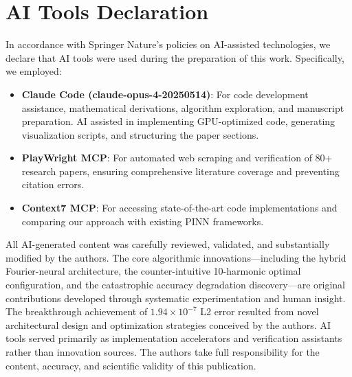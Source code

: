 \section*{AI Tools Declaration}

In accordance with Springer Nature's policies on AI-assisted technologies, we declare that AI tools were used during the preparation of this work. Specifically, we employed:

\begin{itemize}
\item \textbf{Claude Code (claude-opus-4-20250514)}: For code development assistance, mathematical derivations, algorithm exploration, and manuscript preparation. AI assisted in implementing GPU-optimized code, generating visualization scripts, and structuring the paper sections.
\item \textbf{PlayWright MCP}: For automated web scraping and verification of 80+ research papers, ensuring comprehensive literature coverage and preventing citation errors.
\item \textbf{Context7 MCP}: For accessing state-of-the-art code implementations and comparing our approach with existing PINN frameworks.
\end{itemize}

All AI-generated content was carefully reviewed, validated, and substantially modified by the authors. The core algorithmic innovations—including the hybrid Fourier-neural architecture, the counter-intuitive 10-harmonic optimal configuration, and the catastrophic accuracy degradation discovery—are original contributions developed through systematic experimentation and human insight. The breakthrough achievement of $1.94 \times 10^{-7}$ L2 error resulted from novel architectural design and optimization strategies conceived by the authors. AI tools served primarily as implementation accelerators and verification assistants rather than innovation sources. The authors take full responsibility for the content, accuracy, and scientific validity of this publication.

